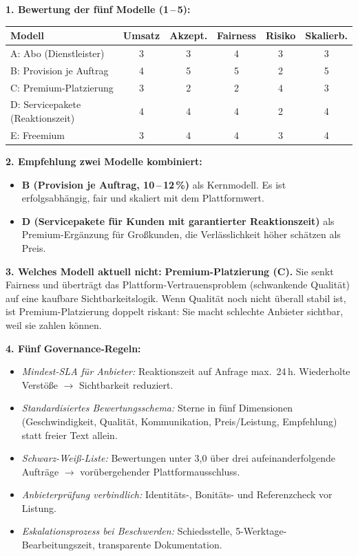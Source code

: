 \documentclass[11pt,a4paper,oneside]{article}
\begin{document}
\begin{loesungbox}
\textbf{1. Bewertung der fünf Modelle (1\,--\,5):}

\smallskip
\begin{tabularx}{\linewidth}{@{}lccccc@{}}
\toprule
\textbf{Modell} & \textbf{Umsatz} & \textbf{Akzept.} & \textbf{Fairness} & \textbf{Risiko} & \textbf{Skalierb.} \\
\midrule
A: Abo (Dienstleister)          & 3 & 3 & 4 & 3 & 3 \\
\midrule
B: Provision je Auftrag         & 4 & 5 & 5 & 2 & 5 \\
\midrule
C: Premium-Platzierung          & 3 & 2 & 2 & 4 & 3 \\
\midrule
D: Servicepakete (Reaktionszeit)& 4 & 4 & 4 & 2 & 4 \\
\midrule
E: Freemium                     & 3 & 4 & 4 & 3 & 4 \\
\bottomrule
\end{tabularx}

\smallskip
\textbf{2. Empfehlung \textendash{} zwei Modelle kombiniert:}
\begin{itemize}
  \item \textbf{B (Provision je Auftrag, 10\,--\,12\,\%)} als Kernmodell. Es ist erfolgsabhängig, fair und skaliert mit dem Plattformwert.
  \item \textbf{D (Servicepakete für Kunden mit garantierter Reaktionszeit)} als Premium-Ergänzung für Großkunden, die Verlässlichkeit höher schätzen als Preis.
\end{itemize}

\textbf{3. Welches Modell aktuell nicht:}
\textbf{Premium-Platzierung (C).} Sie senkt Fairness und überträgt das Plattform-Vertrauensproblem (schwankende Qualität) auf eine kaufbare Sichtbarkeitslogik. Wenn Qualität noch nicht überall stabil ist, ist Premium-Platzierung doppelt riskant: Sie macht schlechte Anbieter sichtbar, weil sie zahlen können.

\textbf{4. Fünf Governance-Regeln:}
\begin{itemize}
  \item \emph{Mindest-SLA für Anbieter:} Reaktionszeit auf Anfrage max.\ 24\,h. Wiederholte Verstöße $\rightarrow$ Sichtbarkeit reduziert.
  \item \emph{Standardisiertes Bewertungsschema:} Sterne in fünf Dimensionen (Geschwindigkeit, Qualität, Kommunikation, Preis/Leistung, Empfehlung) statt freier Text allein.
  \item \emph{Schwarz-Weiß-Liste:} Bewertungen unter 3,0 über drei aufeinanderfolgende Aufträge $\rightarrow$ vorübergehender Plattformausschluss.
  \item \emph{Anbieterprüfung verbindlich:} Identitäts-, Bonitäts- und Referenzcheck vor Listung.
  \item \emph{Eskalationsprozess bei Beschwerden:} Schiedsstelle, 5-Werktage-Bearbeitungszeit, transparente Dokumentation.
\end{itemize}


\end{loesungbox}
\end{document}
